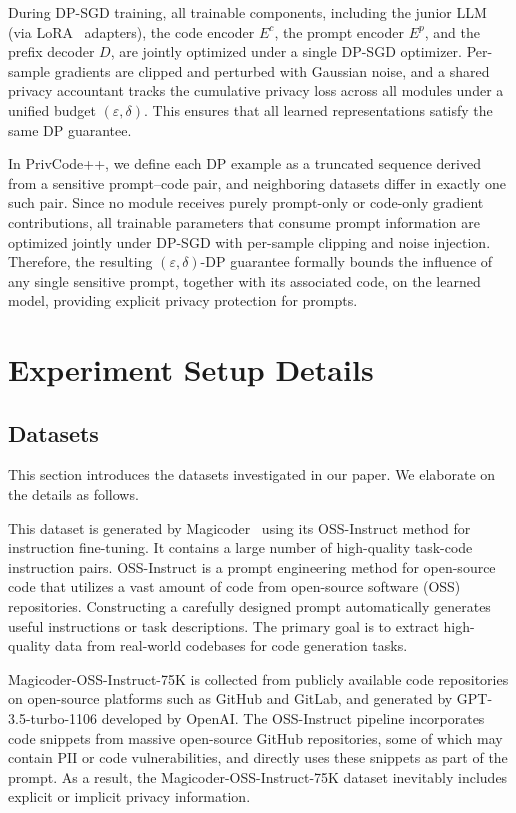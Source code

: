 \documentclass{article}
\theoremstyle{plain}
\theoremstyle{definition}
\theoremstyle{remark}
\def \toolname{PrivCode++}
\begin{document}
{During DP-SGD training, all trainable components, including the junior LLM (via LoRA~\cite{hu2022lora} adapters), the code encoder $E^c$, the prompt encoder $E^p$, and the prefix decoder $D$, are jointly optimized under a single DP-SGD optimizer. Per-sample gradients are clipped and perturbed with Gaussian noise, and a shared privacy accountant tracks the cumulative privacy loss across all modules under a unified budget $(\varepsilon, \delta)$. This ensures that all learned representations satisfy the same DP guarantee.

In \toolname{}, we define each DP example as a truncated sequence derived from a sensitive prompt–code pair, and neighboring datasets differ in exactly one such pair. Since no module receives purely prompt-only or code-only gradient contributions, all trainable parameters that consume prompt information are optimized jointly under DP-SGD with per-sample clipping and noise injection. Therefore, the resulting $(\varepsilon, \delta)$-DP guarantee formally bounds the influence of any single sensitive prompt, together with its associated code, on the learned model, providing explicit privacy protection for prompts.


\section{Experiment Setup Details}
\label{app:setup}

\subsection{Datasets}
\label{app:dataset_details}

This section introduces the datasets investigated in our paper. We elaborate on the details as follows.

 This dataset is generated by Magicoder~\cite{magicoder} using its OSS-Instruct method for instruction fine-tuning. It contains a large number of high-quality task-code instruction pairs. OSS-Instruct is a prompt engineering method for open-source code that utilizes a vast amount of code from open-source software (OSS) repositories. Constructing a carefully designed prompt automatically generates useful instructions or task descriptions. The primary goal is to extract high-quality data from real-world codebases for code generation tasks.


Magicoder-OSS-Instruct-75K is collected from publicly available code repositories on open-source platforms such as GitHub and GitLab, and generated by GPT-3.5-turbo-1106 developed by OpenAI. The OSS-Instruct pipeline incorporates code snippets from massive open-source GitHub repositories, some of which may contain PII or code vulnerabilities, and directly uses these snippets as part of the prompt. As a result, the Magicoder-OSS-Instruct-75K dataset inevitably includes explicit or implicit privacy information.

}
\end{document}
